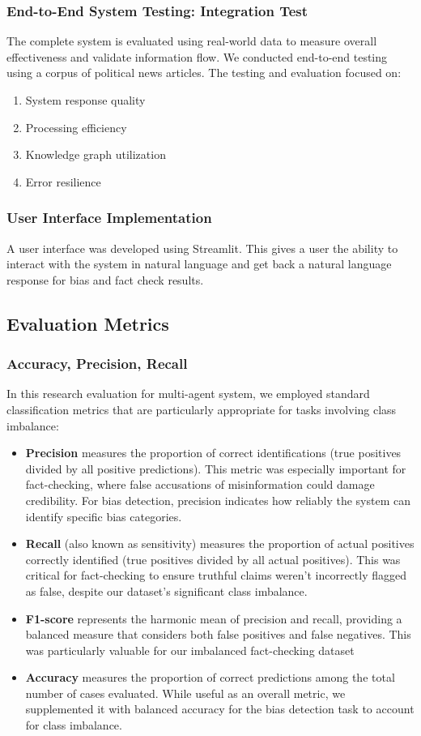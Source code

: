 \documentclass[11pt]{article}
\begin{document}
\subsubsection{End-to-End System Testing: Integration Test}
The complete system is evaluated using real-world data to measure overall effectiveness and validate information flow. We conducted end-to-end testing using a corpus of political news articles. The testing and evaluation focused on:
\begin{enumerate}
    \item System response quality
    \item Processing efficiency
    \item Knowledge graph utilization
    \item Error resilience 
\end{enumerate}

\subsubsection{User Interface Implementation}
A user interface was developed using Streamlit. This gives a user the ability to interact with the system in natural language and get back a natural language response for bias and fact check results. 

\subsection{Evaluation Metrics}
\subsubsection{Accuracy, Precision, Recall}
In this research evaluation for multi-agent system, we employed standard classification metrics that are particularly appropriate for tasks involving class imbalance:
\begin{itemize}
    \item \textbf{Precision} measures the proportion of correct identifications (true positives divided by all positive predictions). This metric was especially important for fact-checking, where false accusations of misinformation could damage credibility. For bias detection, precision indicates how reliably the system can identify specific bias categories.
    \item \textbf{Recall} (also known as sensitivity) measures the proportion of actual positives correctly identified (true positives divided by all actual positives). This was critical for fact-checking to ensure truthful claims weren’t incorrectly flagged as false, despite our dataset’s significant class imbalance.
    \item \textbf{F1-score} represents the harmonic mean of precision and recall, providing a balanced measure that considers both false positives and false negatives. This was particularly valuable for our imbalanced fact-checking dataset 
    \item \textbf{Accuracy} measures the proportion of correct predictions among the total number of cases evaluated. While useful as an overall metric, we supplemented it with balanced accuracy for the bias detection task to account for class imbalance.
\end{itemize}
\end{document}
